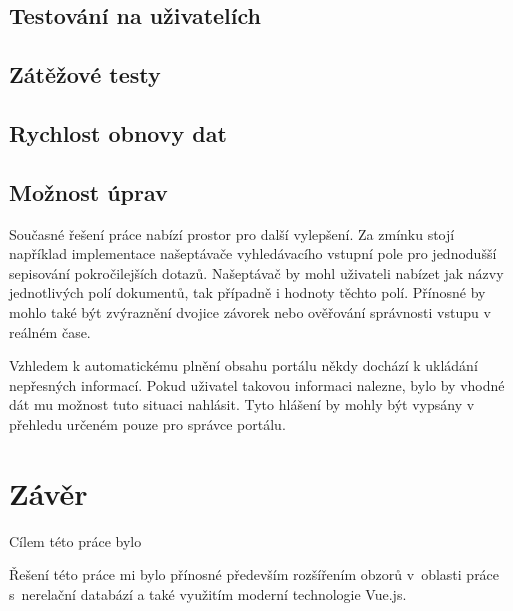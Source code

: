 \section{Testování na uživatelích}
\blindtext[2]

\section{Zátěžové testy}
\blindtext[2]

\section{Rychlost obnovy dat}
\blindtext[2]

\section{Možnost úprav}
Současné řešení práce nabízí prostor pro další vylepšení. Za zmínku stojí například implementace našeptávače vyhledávacího vstupní pole pro jednodušší sepisování pokročilejších dotazů. Našeptávač by mohl uživateli nabízet jak názvy jednotlivých polí dokumentů, tak případně i hodnoty těchto polí. Přínosné by mohlo také být zvýraznění dvojice závorek nebo ověřování správnosti vstupu v reálném čase.

Vzhledem k automatickému plnění obsahu portálu někdy dochází k ukládání nepřesných informací. Pokud uživatel takovou informaci nalezne, bylo by vhodné dát mu možnost tuto situaci nahlásit. Tyto hlášení by mohly být vypsány v přehledu určeném pouze pro správce portálu. 

\blindtext



\chapter{Závěr}
Cílem této práce bylo \blindtext

\blindtext %

Řešení této práce mi bylo přínosné především rozšířením obzorů v~oblasti práce s~nerelační databází a také využitím moderní technologie Vue.js.